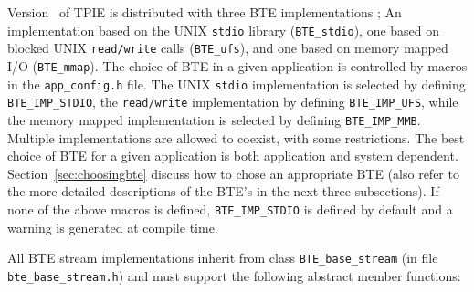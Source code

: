 \begin{comment}
 The BTEs will not, however, be responsible for coordinating the
actions of multiple CPU's and the disks attached to them. In such cases, a
separate instance of a BTE will run on each such CPU, and their actions
will be coordinated by a single multi-threaded MM running at a higher
level. The reason for the functional split between the two levels is that
it will likely be advantageous to be able to use a single BTE written for a
specific piece of hardware with more than one MM, for example, one MM
written for a homogeneous environment and one for a heterogeneous
environment. 
\end{comment}

Version \version~of TPIE is distributed with three BTE implementations ; An
implementation based on the UNIX \verb|stdio| library (\verb|BTE_stdio|),
one based on blocked UNIX {\tt read/write} calls 
(\verb|BTE_ufs|), and one based on memory mapped I/O (\verb|BTE_mmap|). The
choice of BTE in a given application is controlled by macros in the
\verb|app_config.h| file.  The UNIX \verb|stdio| implementation is selected
by defining \verb|BTE_IMP_STDIO|, the \verb|read/write| implementation by
defining \verb|BTE_IMP_UFS|, while the memory mapped implementation is
selected by defining \verb|BTE_IMP_MMB|. Multiple implementations are
allowed to coexist, with some restrictions. The best choice of BTE for a given application is both
application and system dependent. Section~\ref{sec:choosingbte} discuss how
to chose an appropriate BTE (also refer to the more detailed descriptions
of the BTE's in the next three subsections). If none of the above macros is
defined, \verb|BTE_IMP_STDIO| is defined by default and a warning is
generated at compile time.

All BTE stream implementations inherit from class \verb|BTE_base_stream|
(in file \verb|bte_base_stream.h|) and must support the following abstract
member functions:

